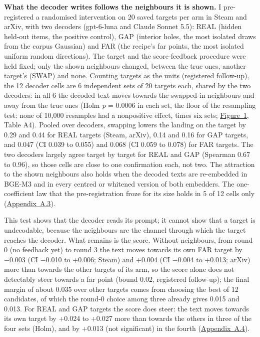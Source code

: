 \documentclass[
  10pt,
]{article}
\begin{document}
\textbf{What the decoder writes follows
the neighbours it is shown.} I
pre-registered a randomised intervention
on 20 saved targets per arm in Steam and
arXiv, with two decoders (gpt-6-luna and
Claude Sonnet 5.5): REAL (hidden
held-out items, the positive control),
GAP (interior holes, the most isolated
draws from the corpus Gaussian) and FAR
(the recipe's far points, the most
isolated uniform random directions). The
target and the score-feedback procedure
were held fixed; only the shown
neighbours changed, between the true
ones, another target's (SWAP) and none.
Counting targets as the units
(registered follow-up), the 12 decoder
cells are 6 independent sets of 20
targets each, shared by the two
decoders: in all 6 the decoded text
moves towards the swapped-in neighbours
and away from the true ones (Holm
\emph{p} = 0.0006 in each set, the floor
of the resampling test: none of 10,000
resamples had a nonpositive effect,
times six sets;
\hyperref[fig:1]{Figure~1}, Table A4).
Pooled over decoders, swapping lowers
the landing on the target by 0.29 and
0.44 for REAL targets (Steam, arXiv),
0.14 and 0.16 for GAP targets, and 0.047
(CI 0.039 to 0.055) and 0.068 (CI 0.059
to 0.078) for FAR targets. The two
decoders largely agree target by target
for REAL and GAP (Spearman 0.67 to
0.96), so those cells are close to one
confirmation each, not two. The
attraction to the shown neighbours also
holds when the decoded texts are
re-embedded in BGE-M3 and in every
centred or whitened version of both
embedders. The one-coefficient law that
the pre-registration froze for its size
holds in 5 of 12 cells only
(\hyperref[app:A.3]{Appendix~A.3}).

This test shows that the decoder reads
its prompt; it cannot show that a target
is undecodable, because the neighbours
are the channel through which the target
reaches the decoder. What remains is the
score. Without neighbours, from round 0
(no feedback yet) to round 3 the text
moves towards its own FAR target by
−0.003 (CI −0.010 to +0.006; Steam) and
+0.004 (CI −0.004 to +0.013; arXiv) more
than towards the other targets of its
arm, so the score alone does not
detectably steer towards a far point
(bound 0.02, registered follow-up); the
final margin of about 0.035 over other
targets comes from choosing the best of
12 candidates, of which the round-0
choice among three already gives 0.015
and 0.013. For REAL and GAP targets the
score does steer: the text moves towards
its own target by +0.024 to +0.027 more
than towards the others in three of the
four sets (Holm), and by +0.013 (not
significant) in the fourth
(\hyperref[app:A.4]{Appendix~A.4}).
\end{document}
